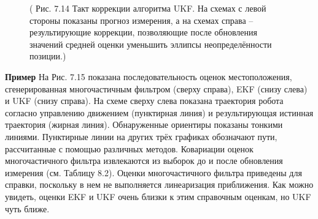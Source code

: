 \documentclass[10pt,a4paper]{article}
\begin{document}
\begin{figure}[H]
	\caption{ (  Рис. 7.14 Такт коррекции алгоритма UKF. На схемах с левой стороны показаны  прогноз измерения, а на схемах справа – результирующие коррекции, позволяющие после обновления значений средней оценки уменьшить эллипсы неопределённости позиции.)}
	\label{fig:714orig}
\end{figure}

\textbf{Пример} На Рис. 7.15 показана последовательность оценок местоположения, сгенерированная многочастичным фильтром (сверху справа), EKF (снизу слева) и UKF (снизу справа). На схеме сверху слева показана траектория робота согласно управлению движением (пунктирная линия) и результирующая истинная траектория (жирная линия). Обнаруженные ориентиры показаны тонкими линиями. Пунктирные линии на других трёх графиках обозначают пути, рассчитанные с помощью различных методов. Ковариации оценок многочастичного фильтра извлекаются из выборок до и после обновления измерения (см. Таблицу 8.2). Оценки многочастичного фильтра приведены для справки, поскольку в нем не выполняется линеаризация приближения. Как можно увидеть, оценки EKF и UKF очень близки к этим справочным оценкам, но UKF чуть ближе.\\
\end{document}
